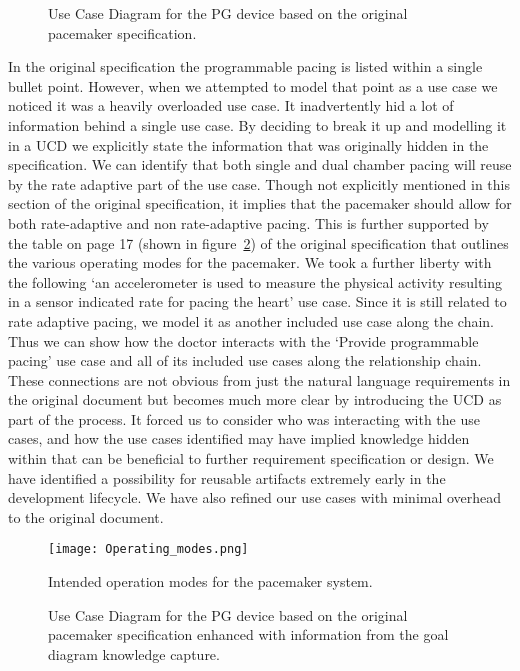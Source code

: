 \begin{figure}
	\centering
	
	\caption{Use Case Diagram for the PG device based on the original pacemaker specification.}
	\label{fig:pg_device_UCD_original_spec}
\end{figure}

In the original specification the programmable pacing is listed within a single bullet point. However, when we attempted to model that point as a use case we noticed it was a heavily overloaded use case. It inadvertently hid a lot of information behind a single use case. By deciding to break it up and modelling it in a UCD we explicitly state the information that was originally hidden in the specification. We can identify that both single and dual chamber pacing will reuse by the rate adaptive part of the use case. Though not explicitly mentioned in this section of the original specification, it implies that the pacemaker should allow for both rate-adaptive and non rate-adaptive pacing. This is further supported by the table on page 17 (shown in figure~\ref{fig:Operating_modes}) of the original specification that outlines the various operating modes for the pacemaker. We took a further liberty with the following `an accelerometer is used to measure the physical activity resulting in a sensor indicated rate for pacing the heart' use case. Since it is still related to rate adaptive pacing, we model it as another included use case along the chain. Thus we can show how the doctor interacts with the `Provide programmable pacing' use case and all of its included use cases along the relationship chain. These connections are not obvious from just the natural language requirements in the original document but becomes much more clear by introducing the UCD as part of the process. It forced us to consider who was interacting with the use cases, and how the use cases identified may have implied knowledge hidden within that can be beneficial to further requirement specification or design. We have identified a possibility for reusable artifacts extremely early in the development lifecycle. We have also refined our use cases with minimal overhead to the original document.

\begin{figure}
	\centering
	\texttt{[image: Operating\_modes.png]}
	\caption{Intended operation modes for the pacemaker system.}
	\label{fig:Operating_modes}
\end{figure}

\begin{figure}
	\centering
	
	\caption{Use Case Diagram for the PG device based on the original pacemaker specification enhanced with information from the goal diagram knowledge capture.}
	\label{fig:pg_device_UCD}
\end{figure}

